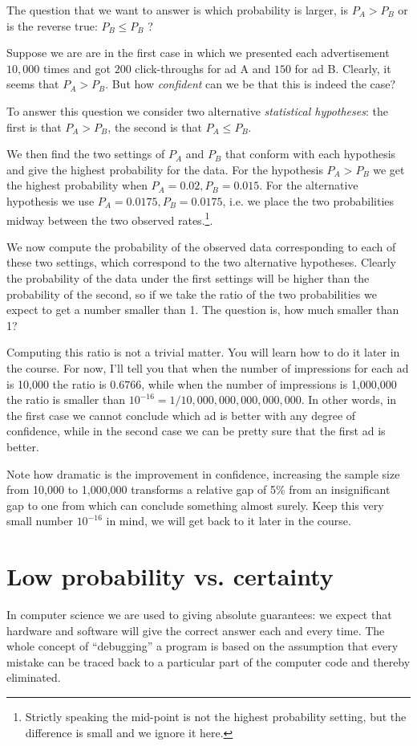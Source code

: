 \documentclass{report}
\theoremstyle{plain}
\theoremstyle{definition}
\begin{document}
The question that we want to answer is which probability is larger, is
$P_A>P_B$ or is the reverse true: $P_B \leq P_B$ ?

Suppose we are are in the first case in which we presented each
advertisement $10,000$ times and got $200$ click-throughs for ad A and
$150$ for ad B. Clearly, it seems that $P_A>P_B$. But how {\em
  confident} can we be that this is indeed the case?

To answer this question we consider two alternative {\em statistical
hypotheses}: the first is that $P_A>P_B$, the second is that $P_A
\leq P_B$. 

We then find the two settings of $P_A$ and $P_B$ that conform with
each hypothesis and give the highest probability for the data.  For
the hypothesis $P_A>P_B$ we get the highest probability when
$P_A=0.02,P_B=0.015$. For the alternative hypothesis we use
$P_A=0.0175,P_B=0.0175$, i.e. we place the two probabilities midway
between the two observed rates.\footnote{Strictly speaking the
  mid-point is not the highest probability setting, but the difference
  is small and we ignore it here.}.

We now compute the probability of the observed data corresponding to
each of these two settings, which correspond to the two alternative
hypotheses. Clearly the probability of the data under the first
settings will be higher than the probability of the second, so if we
take the ratio of the two probabilities we expect to get a number
smaller than 1. The question is, how much smaller than 1?

Computing this ratio is not a trivial matter. You will learn how to
do it later in the course. For now, I'll tell you that when the number
of impressions for each ad is 10,000 the ratio is $0.6766$, while when
the number of impressions is 1,000,000 the ratio is smaller than
$10^{-16} = 1/10,000,000,000,000,000$. In other words, in the first
case we cannot conclude which ad is better with any degree of
confidence, while in the second case we can be pretty sure that the
first ad is better.

Note how dramatic is the improvement in confidence, increasing the
sample size from 10,000 to 1,000,000 transforms a relative gap of 5\%
from an insignificant gap to one from which can conclude something
almost surely. Keep this very small number $10^{-16}$ in mind, we will
get back to it later in the course.

\section{Low probability vs. certainty}
In computer science we are used to giving absolute guarantees: we
expect that hardware and software will give the correct answer each 
and every time. The whole concept of ``debugging'' a program is based
on the assumption that every mistake can be traced back to a
particular part of the computer code and thereby eliminated. 
\end{document}
